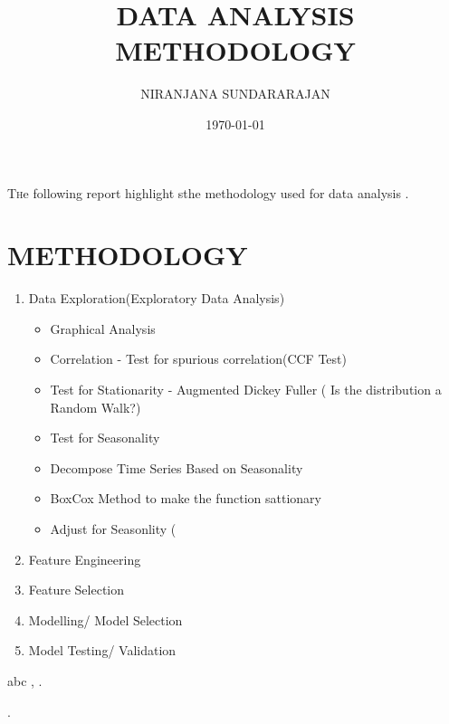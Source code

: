 \documentclass[twoside,twocolumn]{article}
\title{DATA ANALYSIS METHODOLOGY} %
\author{%
\textsc{NIRANJANA SUNDARARAJAN}
}
\date{\today} %
\begin{document}
\maketitle

\lettrine[nindent=2em,lines=1]{T}he following report highlight sthe methodology used for data analysis .\\


\section{METHODOLOGY}
\begin{enumerate}
\item Data Exploration(Exploratory Data Analysis)
\begin{itemize}
\item Graphical Analysis
\item Correlation - Test for spurious correlation(CCF Test)
\item Test for Stationarity - Augmented Dickey Fuller ( Is the distribution a Random Walk?)
\item Test for Seasonality 
\item Decompose Time Series Based on Seasonality
\item  BoxCox Method to make the function sattionary
\item Adjust for Seasonlity ( 
\end{itemize}
\item Feature Engineering
\item Feature Selection
\item Modelling/ Model Selection
\item  Model Testing/ Validation
\end{enumerate}



\begin{thebibliography}{99} 
\bibitem[1]{}abc
, .
 
 \bibitem[2]{}.


\end{thebibliography}

\end{document}

